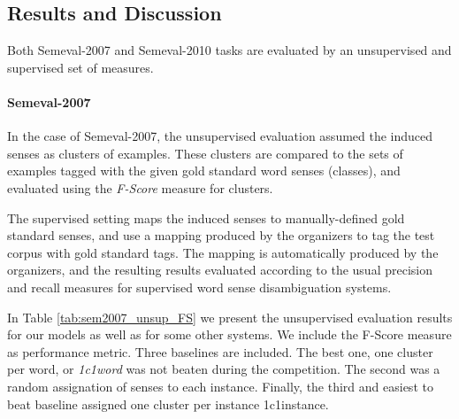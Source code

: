 %



\subsection{Results and Discussion}
Both Semeval-2007 and Semeval-2010 tasks are evaluated by an unsupervised and supervised set of measures. 
\paragraph{Semeval-2007}
In the case of Semeval-2007, the unsupervised evaluation assumed the induced senses as clusters of examples. These clusters are compared to the sets of examples tagged with the given gold standard word senses (classes), and evaluated using the \textit{F-Score} measure for clusters. 
 
The supervised setting maps the induced senses to manually-defined gold standard senses, and use a mapping produced by the organizers to tag the test corpus with gold standard tags. The mapping is
automatically produced by the organizers, and the resulting results evaluated according to the
usual precision and recall measures for supervised word sense disambiguation systems. 


In Table \ref{tab:sem2007_unsup_FS} we present the unsupervised evaluation results for our models as well as for some other systems. We include the F-Score measure as performance metric. Three baselines are included. The best one, one cluster per word, or \textit{1c1word} was not beaten during the competition. The second was a random assignation of senses to each instance. Finally, the third and easiest to beat baseline assigned one cluster per instance {1c1instance}. 

